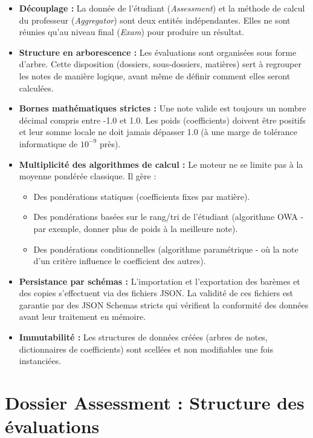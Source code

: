 \documentclass[11pt, a4paper]{article}
\begin{document}
\begin{itemize}
    \item \textbf{Découplage :} La donnée de l'étudiant (\textit{Assessment}) et la méthode de calcul du professeur (\textit{Aggregator}) sont deux entités indépendantes. Elles ne sont réunies qu'au niveau final (\textit{Exam}) pour produire un résultat.
    \item \textbf{Structure en arborescence :} Les évaluations sont organisées sous forme d'arbre. Cette disposition (dossiers, sous-dossiers, matières) sert à regrouper les notes de manière logique, avant même de définir comment elles seront calculées.
    \item \textbf{Bornes mathématiques strictes :} Une note valide est toujours un nombre décimal compris entre -1.0 et 1.0. Les poids (coefficients) doivent être positifs et leur somme locale ne doit jamais dépasser 1.0 (à une marge de tolérance informatique de $10^{-9}$ près).
    \item \textbf{Multiplicité des algorithmes de calcul :} Le moteur ne se limite pas à la moyenne pondérée classique. Il gère :
    \begin{itemize}
        \item Des pondérations statiques (coefficients fixes par matière).
        \item Des pondérations basées sur le rang/tri de l'étudiant (algorithme OWA - par exemple, donner plus de poids à la meilleure note).
        \item Des pondérations conditionnelles (algorithme paramétrique - où la note d'un critère influence le coefficient des autres).
    \end{itemize}
    \item \textbf{Persistance par schémas :} L'importation et l'exportation des barèmes et des copies s'effectuent via des fichiers JSON. La validité de ces fichiers est garantie par des JSON Schemas stricts qui vérifient la conformité des données avant leur traitement en mémoire.
    \item \textbf{Immutabilité :} Les structures de données créées (arbres de notes, dictionnaires de coefficients) sont scellées et non modifiables une fois instanciées.
\end{itemize}


\section{Dossier Assessment : Structure des évaluations}
\end{document}

